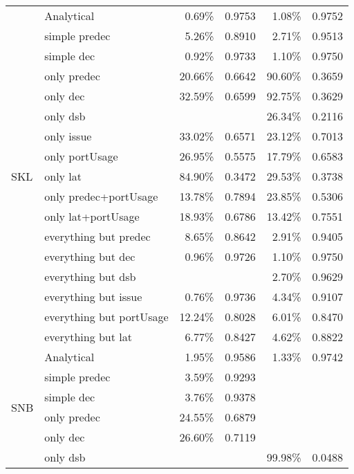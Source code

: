 \documentclass[sigconf,nonacm]{acmart}
\begin{document}
\begin{table}
\begin{center}
\begin{tabular}{llrcrc}
\midrule
\multirow{17}{*}{SKL} & Analytical & 0.69\% & 0.9753 & 1.08\% & 0.9752\\
                      & simple predec  & 5.26\% & 0.8910 & 2.71\% & 0.9513\\
                      & simple dec  & 0.92\% & 0.9733 & 1.10\% & 0.9750\\
                      & only predec  & 20.66\% & 0.6642 & 90.60\% & 0.3659\\
                      & only dec  & 32.59\% & 0.6599 & 92.75\% & 0.3629\\
                      & only dsb  & & & 26.34\% & 0.2116\\
                      & only issue  & 33.02\% & 0.6571 & 23.12\% & 0.7013\\
                      & only portUsage  & 26.95\% & 0.5575 & 17.79\% & 0.6583\\
                      & only lat  & 84.90\% & 0.3472 & 29.53\% & 0.3738\\
                      & only predec+portUsage  & 13.78\% & 0.7894 & 23.85\% & 0.5306\\
                      & only lat+portUsage  & 18.93\% & 0.6786 & 13.42\% & 0.7551\\
                      & everything but predec  & 8.65\% & 0.8642 & 2.91\% & 0.9405\\
                      & everything but dec  & 0.96\% & 0.9726 & 1.10\% & 0.9750\\
                      & everything but dsb  & & & 2.70\% & 0.9629\\
                      & everything but issue  & 0.76\% & 0.9736 & 4.34\% & 0.9107\\
                      & everything but portUsage  & 12.24\% & 0.8028 & 6.01\% & 0.8470\\
                      & everything but lat  & 6.77\% & 0.8427 & 4.62\% & 0.8822\\
\midrule
\multirow{19}{*}{SNB} & Analytical & 1.95\% & 0.9586 & 1.33\% & 0.9742\\
                      & simple predec  & 3.59\% & 0.9293 & & \\
                      & simple dec  & 3.76\% & 0.9378 & & \\
                      & only predec  & 24.55\% & 0.6879 & & \\
                      & only dec  & 26.60\% & 0.7119 & & \\
                      & only dsb  & & & 99.98\% & 0.0488\\

\end{tabular}
\end{center}
\end{table}
\end{document}
